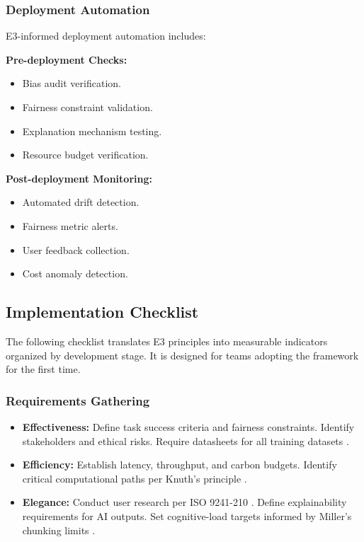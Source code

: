 \documentclass[11pt,a4paper]{article}
\begin{document}
\subsubsection{Deployment Automation}

E3-informed deployment automation includes:

\textbf{Pre-deployment Checks:}
\begin{itemize}[leftmargin=2em]
    \item Bias audit verification.
    \item Fairness constraint validation.
    \item Explanation mechanism testing.
    \item Resource budget verification.
\end{itemize}

\textbf{Post-deployment Monitoring:}
\begin{itemize}[leftmargin=2em]
    \item Automated drift detection.
    \item Fairness metric alerts.
    \item User feedback collection.
    \item Cost anomaly detection.
\end{itemize}


\subsection{Implementation Checklist}

The following checklist translates E3 principles into measurable indicators organized by development stage. It is designed for teams adopting the framework for the first time.

\subsubsection{Requirements Gathering}

\begin{itemize}[leftmargin=2em]
    \item[\textbf{E1}] \textbf{Effectiveness:} Define task success criteria and fairness constraints. Identify stakeholders and ethical risks. Require datasheets for all training datasets \cite{gebru2021datasheets}.
    \item[\textbf{E2}] \textbf{Efficiency:} Establish latency, throughput, and carbon budgets. Identify critical computational paths per Knuth's principle \cite{knuth1974structured}.
    \item[\textbf{E3}] \textbf{Elegance:} Conduct user research per ISO 9241-210 \cite{iso2019ergonomics}. Define explainability requirements for AI outputs. Set cognitive-load targets informed by Miller's chunking limits \cite{miller1956magical}.
\end{itemize}
\end{document}

